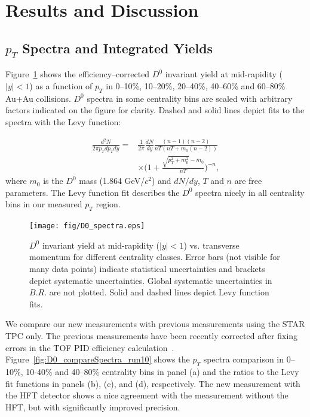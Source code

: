 \documentclass[%
 reprint,	
showpacs,
 amsmath,amssymb,
 aps,
 prc,
]{revtex4-1}
\begin{document}

\section{Results and Discussion}
\label{result}

\subsection{$p_{T}$ Spectra and Integrated Yields}
\label{result:pt}

Figure~\ref{fig:D0_spectra} shows the efficiency--corrected $D^0$ invariant yield at mid-rapidity ($|y|<1$) as a function of $p_{T}$ in 0--10\%, 10--20\%, 20--40\%, 40--60\% and 60--80\% Au+Au collisions. $D^0$ spectra in some centrality bins are scaled with arbitrary factors indicated on the figure for clarity. Dashed and solid lines depict fits to the spectra with the Levy function:

\begin{equation}
  \begin{aligned}
    \frac{d^2N}{2\pi p_{T}dp_{T}dy} = 
   & \frac{1}{2\pi}\frac{dN}{dy}\frac{(n-1)(n-2)}{nT(nT+m_0(n-2))} \\
  & \times \bigg(1+\frac{\sqrt{p_{T}^2+m_0^2}-m_0}{nT}\bigg)^{-n},
  \end{aligned}
\label{equ:equation4}
\end{equation}
where $m_0$ is the $D^0$ mass (1.864 GeV/$c^2$) and $dN/dy$, $T$ and $n$ are free parameters. The Levy function fit describes the $D^0$ spectra nicely in all centrality bins in our measured $p_T$ region.


\begin{figure}
\centering
\texttt{[image: fig/D0\_spectra.eps]}
\caption{$D^{0}$ invariant yield at mid-rapidity ($|y|<1$) vs. transverse momentum for different centrality classes. Error bars (not visible for many data points) indicate statistical uncertainties and brackets depict systematic uncertainties. Global systematic uncertainties in $B.R.$ are not plotted. Solid and dashed lines depict Levy function fits.}
\label{fig:D0_spectra} 
\end{figure}


We compare our new measurements with previous measurements using the STAR TPC only. The previous measurements have been recently corrected after fixing errors in the TOF PID efficiency calculation~\cite{Star_D_RAA}. Figure~\ref{fig:D0_compareSpectra_run10} shows the $p_{T}$ spectra comparison in 0--10\%, 10-40\% and 40--80\% centrality bins in panel (a) and the ratios to the Levy fit functions in panels (b), (c), and (d), respectively. The new measurement with the HFT detector shows a nice agreement with the measurement without the HFT, but with significantly improved precision.
\end{document}
